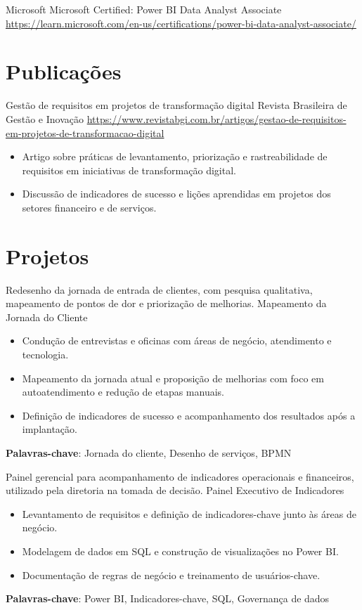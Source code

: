 \documentclass[a4paper, serif, 10pt]{moderncv}
\begin{document}
        {Microsoft}
        {Microsoft Certified: Power BI Data Analyst Associate}
        {\url{https://learn.microsoft.com/en-us/certifications/power-bi-data-analyst-associate/}}
        {}
        {}
\section{Publicações}

        {Gestão de requisitos em projetos de transformação digital}
        {Revista Brasileira de Gestão e Inovação}
        {\url{https://www.revistabgi.com.br/artigos/gestao-de-requisitos-em-projetos-de-transformacao-digital}}
        {}
        {\begin{itemize}
\item Artigo sobre práticas de levantamento, priorização e rastreabilidade de requisitos em iniciativas de transformação digital.
\item Discussão de indicadores de sucesso e lições aprendidas em projetos dos setores financeiro e de serviços.
\end{itemize}}
\section{Projetos}

        {Redesenho da jornada de entrada de clientes, com pesquisa qualitativa, mapeamento de pontos de dor e priorização de melhorias.}
        {Mapeamento da Jornada do Cliente}
        {}
        {}
        {\begin{itemize}
\item Condução de entrevistas e oficinas com áreas de negócio, atendimento e tecnologia.
\item Mapeamento da jornada atual e proposição de melhorias com foco em autoatendimento e redução de etapas manuais.
\item Definição de indicadores de sucesso e acompanhamento dos resultados após a implantação.
\end{itemize}
\textbf{Palavras-chave}: Jornada do cliente, Desenho de serviços, BPMN}

        {Painel gerencial para acompanhamento de indicadores operacionais e financeiros, utilizado pela diretoria na tomada de decisão.}
        {Painel Executivo de Indicadores}
        {}
        {}
        {\begin{itemize}
\item Levantamento de requisitos e definição de indicadores-chave junto às áreas de negócio.
\item Modelagem de dados em SQL e construção de visualizações no Power BI.
\item Documentação de regras de negócio e treinamento de usuários-chave.
\end{itemize}
\textbf{Palavras-chave}: Power BI, Indicadores-chave, SQL, Governança de dados}
\end{document}
